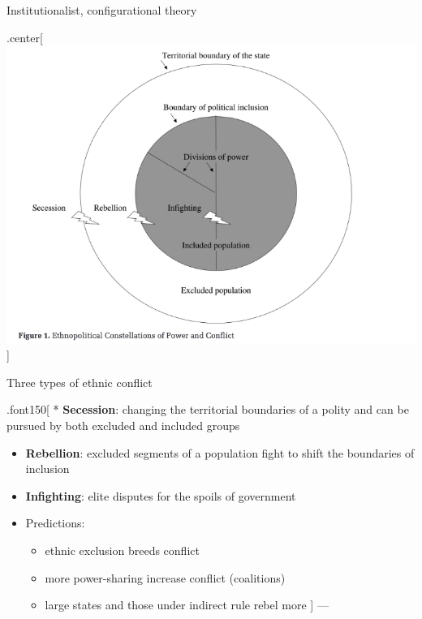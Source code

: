 \documentclass[ignorenonframetext,]{beamer}
\providecommand{\tightlist}{%
  \setlength{\itemsep}{0pt}\setlength{\parskip}{0pt}}
\begin{document}
\begin{frame}{Institutionalist, configurational theory}

\begin{block}{.center{[}\includegraphics{wimmer01.png}{]}}

\end{block}

\end{frame}

\begin{frame}{Three types of ethnic conflict}

.font150{[} * \textbf{Secession}: changing the territorial boundaries of
a polity and can be pursued by both excluded and included groups

\begin{itemize}
\item
  \textbf{Rebellion}: excluded segments of a population fight to shift
  the boundaries of inclusion
\item
  \textbf{Infighting}: elite disputes for the spoils of government
\item
  Predictions:

  \begin{itemize}
  \tightlist
  \item
    ethnic exclusion breeds conflict
  \item
    more power-sharing increase conflict (coalitions)
  \item
    large states and those under indirect rule rebel more {]} ---
  \end{itemize}
\end{itemize}

\end{frame}
\end{document}

